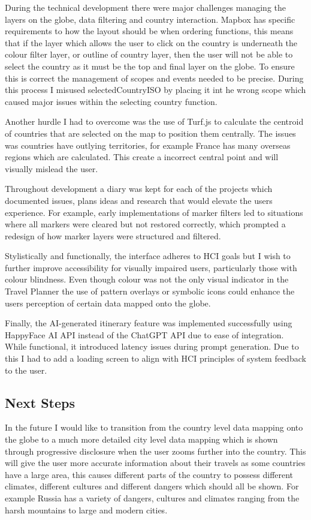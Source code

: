 \documentclass[]{project_final}
\begin{document}
During the technical development there were major challenges managing the layers on the globe, data filtering and country interaction. Mapbox has specific requirements to how the layout should be when ordering functions, this means that if the layer which allows the user to click on the country is underneath the colour filter layer, or outline of country layer, then the user will not be able to select the country as it must be the top and final layer on the globe. To ensure this is correct the management of scopes and events needed to be precise. During this process I misused selectedCountryISO by placing it int he wrong scope which caused major issues within the selecting country function.

Another hurdle I had to overcome was the use of Turf.js to calculate the centroid of countries that are selected on the map to position them centrally. The issues was countries have outlying territories, for example France has many overseas regions which are calculated. This create a incorrect central point and will visually mislead the user.

Throughout development a diary was kept for each of the projects which documented issues, plans ideas and research that would elevate the users experience. For example, early implementations of marker filters led to situations where all markers were cleared but not restored correctly, which prompted a redesign of how marker layers were structured and filtered.

Stylistically and functionally, the interface adheres to HCI goals but I wish to further improve accessibility for visually impaired users, particularly those with colour blindness. Even though colour was not the only visual indicator in the Travel Planner the use of pattern overlays or symbolic icons could enhance the users perception of certain data mapped onto the globe.

Finally, the AI-generated itinerary feature was implemented successfully using HappyFace AI API instead of the ChatGPT API due to ease of integration. While functional, it introduced latency issues during prompt generation. Due to this I had to add a loading screen to align with HCI principles of system feedback to the user.
\subsection{Next Steps}

In the future I would like to transition from the country level data mapping onto the globe to a much more detailed city level data mapping which is shown through progressive disclosure when the user zooms further into the country. This will give the user more accurate information about their travels as some countries have a large area, this causes different parts of the country to possess different climates, different cultures and different dangers which should all be shown. For example Russia has a variety of dangers, cultures and climates ranging from the harsh mountains to large and modern cities.
\end{document}
